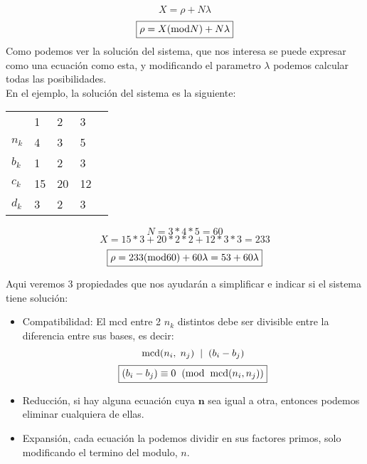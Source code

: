 \[
        \boxed{X = \rho + N \lambda}
\]
\[
        \boxed{\rho = X(\textnormal{mod}N) + N\lambda}
\]
\noindent Como podemos ver la solución del sistema, que nos interesa se puede expresar como una ecuación como esta, y modificando el parametro \(\lambda\) podemos calcular todas las posibilidades.\\ En el ejemplo, la solución del sistema es la siguiente:
\begin{table}[h]
        \begin{tabular}{lllll}
                \multicolumn{1}{l|}{}        & \multicolumn{1}{l|}{1}  & \multicolumn{1}{l|}{2}  & \multicolumn{1}{l|}{3}  & \\ \cline{1-4}
                \multicolumn{1}{l|}{\(n_k\)} & \multicolumn{1}{l|}{4}  & \multicolumn{1}{l|}{3}  & \multicolumn{1}{l|}{5}  & \\ \cline{1-4}
                \multicolumn{1}{l|}{\(b_k\)} & \multicolumn{1}{l|}{1}  & \multicolumn{1}{l|}{2}  & \multicolumn{1}{l|}{3}  & \\ \cline{1-4}
                \multicolumn{1}{l|}{\(c_k\)} & \multicolumn{1}{l|}{15} & \multicolumn{1}{l|}{20} & \multicolumn{1}{l|}{12} & \\ \cline{1-4}
                \multicolumn{1}{l|}{\(d_k\)} & \multicolumn{1}{l|}{3}  & \multicolumn{1}{l|}{2}  & \multicolumn{1}{l|}{3}  & \\
        \end{tabular}
\end{table}
\[
        N = 3*4*5 = 60
\]
\[
        X = 15*3+ 20*2*2+12*3*3=233
\]
\[
        \boxed{\rho = 233(\textnormal{mod}60) + 60\lambda = 53 + 60\lambda}
\]
\noindent{} \par
\noindent Aqui veremos 3 propiedades que nos ayudarán a simplificar e indicar si el sistema tiene solución:
\begin{itemize}
        \item Compatibilidad: El mcd entre 2 \(n_k\) distintos debe ser divisible entre la diferencia entre sus bases, es decir:
              \[
                      \textnormal{mcd}(n_i,\hspace{1mm}n_j) \hspace{2mm}| \hspace{2mm} (b_i-b_j)
              \]
              \[
                      \boxed{(b_i - b_j) \equiv 0 \hspace{2mm}(\textnormal{mod}\hspace{2mm}\textnormal{mcd}(n_i,n_j))}
              \]
        \item Reducción, si hay alguna ecuación cuya \(\mathbf{n}\) sea igual a otra, entonces podemos eliminar cualquiera de ellas.
        \item Expansión, cada ecuación la podemos dividir en sus factores primos, solo modificando el termino del modulo, \(n\).
\end{itemize}
